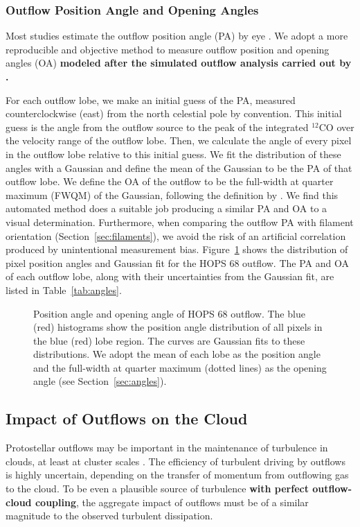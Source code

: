 \documentclass[twocolumn]{aastex63}
\newcommand{\example}{HOPS 68}
\newcommand{\co}[1][]{\ensuremath{^{#1}}CO}
\begin{document}
\subsubsection{Outflow Position Angle and Opening Angles\label{sec:angles}}
Most studies estimate the outflow position angle (PA) by eye \citep[e.g.][]{Morgan91,Takahashi08,Plunkett13,Stephens17,Kong19,Tanabe19}. We adopt a more reproducible and objective method to measure outflow position and opening angles (OA) \textbf{modeled after the simulated outflow analysis carried out by \citet{Offner11}.}

For each outflow lobe, we make an initial guess of the PA, measured counterclockwise (east) from the north celestial pole by convention. This initial guess is the angle from the outflow source to the peak of the integrated \co[12]{} over the velocity range of the outflow lobe. Then, we calculate the angle of every pixel in the outflow lobe relative to this initial guess. We fit the distribution of these angles with a Gaussian and define the mean of the Gaussian to be the PA of that outflow lobe. We define the OA of the outflow to be the full-width at quarter maximum (FWQM) of the Gaussian, following the definition by \cite{Offner11}. We find this automated method does a suitable job producing a similar PA and OA to a visual determination. Furthermore, when comparing the outflow PA with filament orientation (Section~\ref{sec:filaments}), we avoid the risk of an artificial correlation produced by unintentional measurement bias. Figure~\ref{fig:angles} shows the distribution of pixel position angles and Gaussian fit for the \example{} outflow. The PA and OA of each outflow lobe, along with their uncertainties from the Gaussian fit, are listed in Table~\ref{tab:angles}.

\begin{figure}
\caption{Position angle and opening angle of \example{} outflow. The blue (red) histograms show the position angle distribution of all pixels in the blue (red) lobe region. The curves are Gaussian fits to these distributions. We adopt the mean of each lobe as the position angle and the full-width at quarter maximum (dotted lines) as the opening angle (see Section~\ref{sec:angles}).\label{fig:angles}}
\end{figure}


\subsection{Impact of Outflows on the Cloud}\label{sec:impact}
Protostellar outflows may be important in the maintenance of turbulence in clouds, at least at cluster scales \citep{Nakamura07}. The efficiency of turbulent driving by outflows is highly uncertain, depending on the transfer of momentum from outflowing gas to the cloud. To be even a plausible source of turbulence \textbf{with perfect outflow-cloud coupling}, the aggregate impact of outflows must be of a similar magnitude to the observed turbulent dissipation.
\end{document}
